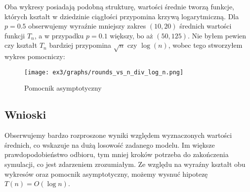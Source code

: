 \documentclass{article}
\begin{document}
Oba wykresy posiadają podobną strukturę, wartości średnie tworzą funkcje, których kształt w dziedzinie ciągłości przypomina krzywą logarytmiczną. Dla $p=0.5$ obserwujemy wyraźnie mniejszy zakres $(10,20)$ średnich wartości funkcji $T_n$, a w przypadku $p=0.1$ większy, bo aż $(50,125)$.
Nie byłem pewien czy kształt $T_n$ bardziej przypomina $\sqrt{n}$ czy $\log(n)$, wobec tego stworzyłem wykres pomocniczy:

\begin{figure}[H]
    \centering
    \texttt{[image: ex3/graphs/rounds\_vs\_n\_div\_log\_n.png]}
    \caption{Pomocnik asymptotyczny}
    \label{fig:enter-label}
\end{figure}

\subsection{Wnioski}

Obserwujemy bardzo rozproszone wyniki względem wyznaczonych wartości średnich, co wskazuje na dużą losowość zadanego modelu. Im większe prawdopodobieństwo odbioru, tym mniej kroków potrzeba do zakończenia symulacji, co jest zdarzeniem zrozumiałym. Ze względu na wyraźny kształt obu wykresów oraz pomocnik asymptotyczny, możemy wysnuć hipotezę $T(n)=O(\log n)$.
\end{document}
